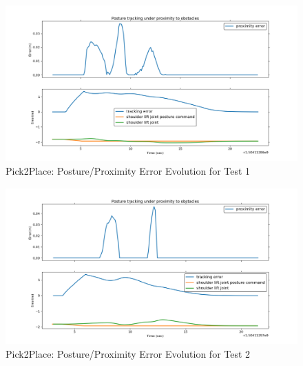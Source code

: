 \begin{figure}[H]
\centering
\includegraphics[width=15cm,height=6cm,center]{chapters/doa/images/delft/test_pick2place/test0.png}
\caption{Pick2Place: Posture/Proximity Error Evolution for Test 1}
\label{pick2place:test1}
\end{figure}

\begin{figure}[H]
\centering
\includegraphics[width=15cm,height=6cm,center]{chapters/doa/images/delft/test_pick2place/test1.png}
\caption{Pick2Place: Posture/Proximity Error Evolution for Test 2}
\label{pick2place:test2}
\end{figure}

